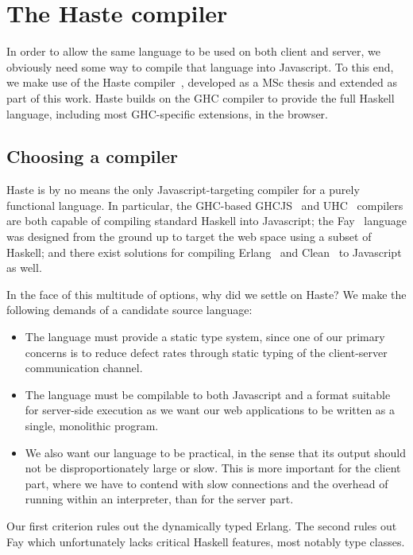 \documentclass[preprint]{sigplanconf}
\begin{document}
\section{The Haste compiler}

In order to allow the same language to be used on both client and server, we
obviously need some way to compile that language into Javascript. To this end,
we make use of the Haste compiler\ \cite{haste}, developed as a MSc thesis and
extended as part of this work. Haste builds on the GHC compiler to provide
the full Haskell language, including most GHC-specific extensions, in the
browser.

\subsection{Choosing a compiler}

Haste is by no means the only Javascript-targeting compiler for a purely
functional language. In particular, the GHC-based GHCJS\ \cite{ghcjs} and
UHC\ \cite{uhc} compilers are both capable of compiling standard Haskell into
Javascript; the Fay\ \cite{fay} language was designed from the ground up to
target the web space using a subset of Haskell; and there exist solutions for
compiling Erlang\ \cite{jserlang} and Clean\ \cite{jsclean} to Javascript as
well.

In the face of this multitude of options, why did we settle on Haste? We make
the following demands of a candidate source language:

\begin{itemize}
  \item The language must provide a static type system, since one of our
        primary concerns is to reduce defect rates through static typing of
        the client-server communication channel.
  \item The language must be compilable to both Javascript and a format
        suitable for server-side execution as we want our web applications
        to be written as a single, monolithic program.
  \item We also want our language to be practical, in the sense that its output
        should not be disproportionately large or slow. This is more important
        for the client part, where we have to contend with slow connections and
        the overhead of running within an interpreter, than for the server part.
\end{itemize}

Our first criterion rules out the dynamically typed Erlang. The second rules
out Fay which unfortunately lacks critical Haskell features, most notably type
classes.
\end{document}
